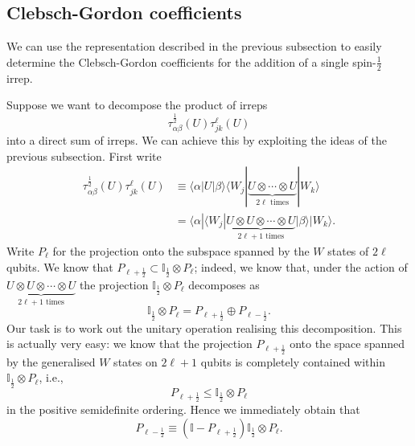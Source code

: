 \documentclass[12pt]{amsart}
\theoremstyle{definition}
\theoremstyle{remark}
\numberwithin{equation}{section}
\begin{document}
\subsection{Clebsch-Gordon coefficients}
We can use the representation described in the previous subsection to easily determine the Clebsch-Gordon coefficients for the addition of a single spin-$\frac12$ irrep. 

Suppose we want to decompose the product of irreps
\begin{equation}
	\tau_{\alpha\beta}^{\frac12}(U)\tau_{jk}^{\ell}(U)
\end{equation}
into a direct sum of irreps. We can achieve this by exploiting the ideas of the previous subsection. First write
\begin{equation}
	\begin{split}
		\tau_{\alpha\beta}^{\frac12}(U)\tau_{jk}^{\ell}(U) &\equiv \langle \alpha|U|\beta\rangle \langle W_j| \underbrace{U\otimes \cdots \otimes U}_{\text{$2\ell$ times}} |W_k\rangle \\
		&= \langle\alpha| \langle W_j| \underbrace{U\otimes U\otimes \cdots \otimes U}_{\text{$2\ell + 1$ times}} |\beta\rangle|W_k\rangle.
	\end{split}
\end{equation}
Write $P_{\ell}$ for the projection onto the subspace spanned by the $W$ states of $2\ell$ qubits. We know that $P_{\ell+\frac12} \subset \mathbb{I}_{\frac12}\otimes P_{\ell}$; indeed, we know that, under the action of $\underbrace{U\otimes U\otimes \cdots \otimes U}_{\text{$2\ell + 1$ times}}$ the projection $\mathbb{I}_{\frac12}\otimes P_{\ell}$ decomposes as
\begin{equation}
	\mathbb{I}_{\frac12}\otimes P_{\ell} = P_{\ell+\frac12} \oplus P_{\ell-\frac12}.
\end{equation}
Our task is to work out the unitary operation realising this decomposition. This is actually very easy: we know that the projection $P_{\ell+\frac12}$ onto the space spanned by the generalised $W$ states on $2\ell+1$ qubits is completely contained within $\mathbb{I}_{\frac12}\otimes P_{\ell}$, i.e.,
\begin{equation}
	P_{\ell+\frac12} \le \mathbb{I}_{\frac12}\otimes P_{\ell}
\end{equation}
in the positive semidefinite ordering. Hence we immediately obtain that
\begin{equation}
	P_{\ell-\frac12} \equiv (\mathbb{I} - P_{\ell+\frac12})\mathbb{I}_{\frac12}\otimes P_{\ell}.
\end{equation}
\end{document}
